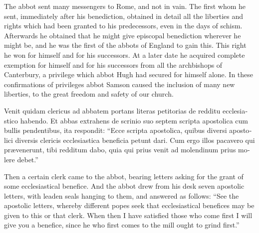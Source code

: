 \documentclass{book}
\begin{document}
\begin{paracol}{2}
\begin{otherlanguage}{latin}
\end{otherlanguage}

\switchcolumn

The abbot sent many messengers to Rome, and not in vain. The first whom he sent, immediately after his benediction, obtained in detail all the liberties and rights which had been granted to his predecessors, even in the days of schism. Afterwards he obtained that he might give episcopal benediction wherever he might be, and he was the first of the abbots of England to gain this. This right he won for himself and for his successors. At a later date he acquired complete exemption for himself and for his successors from all the archbishops of Canterbury, a privilege which abbot Hugh had secured for himself alone. In these confirmations of privileges abbot Samson caused the inclusion of many new liberties, to the great freedom and safety of our church.

\switchcolumn*

\begin{otherlanguage}{latin}
Venit quidam clericus ad abbatem portans literas petitorias de redditu ecclesiastico habendo. Et abbas extrahens de scrinio suo septem scripta apostolica cum bullis pendentibus, ita respondit: ``Ecce scripta apostolica, quibus diversi apostolici diversis clericis ecclesiastica beneficia petunt dari. Cum ergo illos pacavero qui pr\ae{}venerunt, tibi redditum dabo, quia qui prius venit ad molendinum prius molere debet.''
\end{otherlanguage}

\switchcolumn

Then a certain clerk came to the abbot, bearing letters asking for the grant of some ecclesiastical benefice. And the abbot drew from his desk seven apostolic letters, with leaden seals hanging to them, and answered as follows: ``See the apostolic letters, whereby different popes seek that ecclesiastical benefices may be given to this or that clerk. When then I have satisfied those who come first I will give you a benefice, since he who first comes to the mill ought to grind first.''

\switchcolumn*


\end{paracol}
\end{document}
